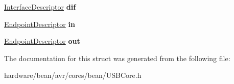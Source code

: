 \begin{DoxyCompactItemize}
\item 
\hypertarget{struct_c_d_c_descriptor_ad9e994faf01eac6b9a5ae31d2c028e02}{}\hyperlink{struct_interface_descriptor}{Interface\+Descriptor} {\bfseries dif}\label{struct_c_d_c_descriptor_ad9e994faf01eac6b9a5ae31d2c028e02}

\item 
\hypertarget{struct_c_d_c_descriptor_af7c4a71ccaa04b9158318b02d64522e6}{}\hyperlink{struct_endpoint_descriptor}{Endpoint\+Descriptor} {\bfseries in}\label{struct_c_d_c_descriptor_af7c4a71ccaa04b9158318b02d64522e6}

\item 
\hypertarget{struct_c_d_c_descriptor_a24ee64d6d086973e16e7a8cd232da817}{}\hyperlink{struct_endpoint_descriptor}{Endpoint\+Descriptor} {\bfseries out}\label{struct_c_d_c_descriptor_a24ee64d6d086973e16e7a8cd232da817}

\end{DoxyCompactItemize}


The documentation for this struct was generated from the following file\+:\begin{DoxyCompactItemize}
\item 
hardware/bean/avr/cores/bean/U\+S\+B\+Core.\+h\end{DoxyCompactItemize}
